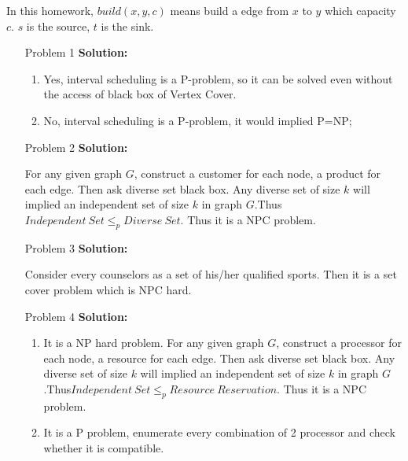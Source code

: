 \normalfont\documentclass[letterpaper,11pt]{article}
\begin{document}
\setlength{\parindent}{2ex}
\newcommand{\header}{
	\noindent {}
}
\bigskip
\header
In this homework, $build(x,y,c)$ means build a edge from $x$ to $y$ which capacity $c$.
$s$ is the source, $t$ is the sink.
\begin{enumerate}
\item [Problem 1]\textbf{Solution:}\par
	\begin{enumerate}
		\item Yes, interval scheduling is a P-problem, so it can be solved even without the access of black box of Vertex Cover.
		\item No, interval scheduling is a P-problem, it would implied P=NP;
	\end{enumerate}
\item [Problem 2]\textbf{Solution:}\par
	For any given graph $G$, construct a customer for each node, a product for each edge. Then ask diverse set black box. Any diverse set of size $k$ will implied an independent set of size $k$ in graph $G$.Thus$Independent\ Set \le_p Diverse\ Set$. Thus it is a NPC problem.
\item [Problem 3]\textbf{Solution:}\par
	Consider every counselors as a set of his/her qualified sports. Then it is a set cover problem which is NPC hard.
\item [Problem 4]\textbf{Solution:}\par
\begin{enumerate}
		\item It is a NP hard problem.  For any given graph $G$, construct a processor for each node, a resource for each edge. Then ask diverse set black box. Any diverse set of size $k$ will implied an independent set of size $k$ in graph $G$.Thus$Independent\ Set \le_p Resource\ Reservation$. Thus it is a NPC problem.
		\item It is a P problem, enumerate every combination of 2 processor and check whether it is compatible.

\end{enumerate}
\end{enumerate}
\end{document}
